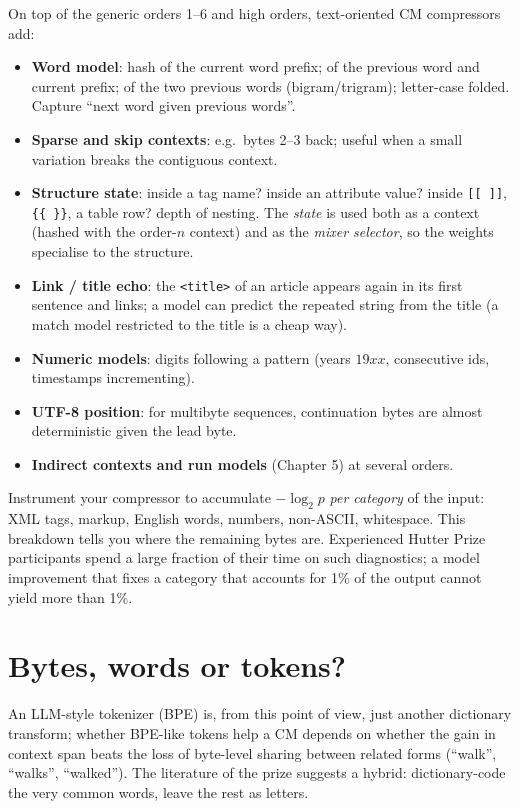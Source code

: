 \documentclass[11pt,a4paper,openany]{book}
\theoremstyle{definition}
\theoremstyle{remark}
\begin{document}
On top of the generic orders 1--6 and high orders, text-oriented CM compressors add:
\begin{itemize}
\item \textbf{Word model}: hash of the current word prefix; of the previous word and current prefix; of the two previous words (bigram/trigram); letter-case folded. Capture ``next word given previous words''.
\item \textbf{Sparse and skip contexts}: e.g.\ bytes 2--3 back; useful when a small variation breaks the contiguous context.
\item \textbf{Structure state}: inside a tag name? inside an attribute value? inside \verb|[[ ]]|, \verb|{{ }}|, a table row? depth of nesting. The \emph{state} is used both as a context (hashed with the order-$n$ context) and as the \emph{mixer selector}, so the weights specialise to the structure.
\item \textbf{Link / title echo}: the \verb|<title>| of an article appears again in its first sentence and links; a model can predict the repeated string from the title (a match model restricted to the title is a cheap way).
\item \textbf{Numeric models}: digits following a pattern (years $19xx$, consecutive ids, timestamps incrementing).
\item \textbf{UTF-8 position}: for multibyte sequences, continuation bytes are almost deterministic given the lead byte.
\item \textbf{Indirect contexts and run models} (Chapter 5) at several orders.
\end{itemize}

\begin{handson}
Instrument your compressor to accumulate $-\log_2p$ \emph{per category} of the input: XML tags, markup, English words, numbers, non-ASCII, whitespace. This breakdown tells you where the remaining bytes are. Experienced Hutter Prize participants spend a large fraction of their time on such diagnostics; a model improvement that fixes a category that accounts for 1\% of the output cannot yield more than 1\%.
\end{handson}

\section{Bytes, words or tokens?}

An LLM-style tokenizer (BPE) is, from this point of view, just another dictionary transform; whether BPE-like tokens help a CM depends on whether the gain in context span beats the loss of byte-level sharing between related forms (``walk'', ``walks'', ``walked''). The literature of the prize suggests a hybrid: dictionary-code the very common words, leave the rest as letters.
\end{document}
